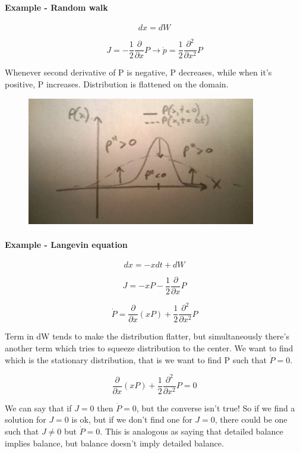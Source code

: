 \documentclass[a4paper, italian, openany]{book}
\begin{document}
\paragraph{Example - Random walk}

$$dx=dW$$

$$J = -\frac{1}{2}\frac{\partial}{\partial x} P \rightarrow \dot{p} = \frac{1}{2}\frac{\partial^2}{\partial x^2}P$$

Whenever second derivative of P is negative, P decreases, while when it's positive, P increases. Distribution is flattened on the domain.

\begin{figure}[H]
\centering
\includegraphics[width=100mm]{img/pic26.jpg}
\end{figure}

\paragraph{Example - Langevin equation}

$$dx = -xdt +dW$$

$$J = -xP -\frac{1}{2}\frac{\partial}{\partial x} P$$

$$\dot{P} = \frac{\partial}{\partial x} (xP) + \frac{1}{2}\frac{\partial^2}{\partial x^2} P$$

Term in dW tends to make the distribution flatter, but simultaneously there's another term which tries to squeeze distribution to the center.\newline
We want to find which is the stationary distribution, that is we want to find P such that $\dot{P}=0$.

$$\frac{\partial}{\partial x} (xP) + \frac{1}{2}\frac{\partial^2}{\partial x^2} P = 0$$

We can say that if $J=0$ then $\dot{P} = 0$, but the converse isn't true! So if we find a solution for $J=0$ is ok, but if we don't find one for $J=0$, there could be one such that $J \ne 0$ but $\dot{P} = 0$. This is analogous as saying that detailed balance implies balance, but balance doesn't imply detailed balance.
\end{document}
